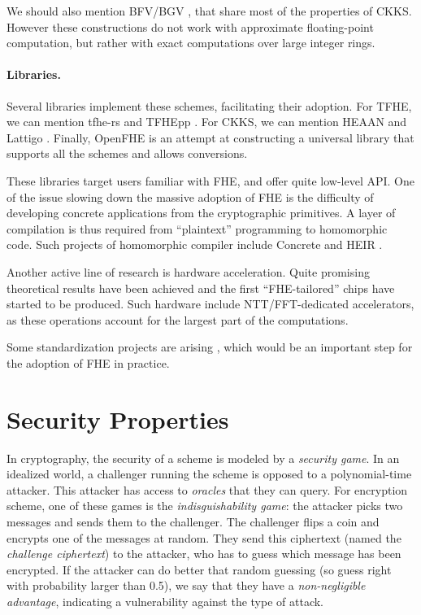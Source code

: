 We should also mention BFV/BGV \cite{C:Brakerski12, bgv, EPRINT:FanVer12}, that share most of the properties of CKKS. However these constructions do not work with approximate floating-point computation, but rather with exact computations over large integer rings.


\paragraph{Libraries.}
Several libraries implement these schemes, facilitating their adoption. For \gls{TFHE}, we can mention tfhe-rs \cite{tfhe-rs}  and TFHEpp \cite{TFHEpp}. For CKKS, we can mention HEAAN \cite{heaan} and Lattigo \cite{lattigo}. Finally, OpenFHE \cite{OpenFHE} is an attempt at constructing a universal library that supports all the schemes and allows conversions.


These libraries target users familiar with \gls{FHE}, and offer quite low-level API. One of the issue slowing down the massive adoption of \gls{FHE} is the difficulty of developing concrete applications from the cryptographic primitives. A layer of compilation is thus required from ``plaintext'' programming to homomorphic code. Such projects of homomorphic compiler include Concrete \cite{Concrete} and HEIR \cite{HEIR}.

\medskip
Another active line of research is hardware acceleration. Quite promising theoretical results have been achieved \cite{TCHES:GVPHMS23, EPRINT:BBTV23a, EPRINT:CPBFSJ23, EPRINT:KHMR24} and the first ``\gls{FHE}-tailored'' chips have started to be produced. Such hardware include \acrshort{NTT}/\acrshort{FFT}-dedicated accelerators, as these operations account for the largest part of the computations. 


Some standardization projects are arising \cite{HomomorphicEncryptionSecurityStandard, call_nist}, which would be an important step for the adoption of \gls{FHE} in practice.
 	


\section{Security Properties}


In cryptography, the security of a scheme is modeled by a \textit{security game}. In an idealized world, a challenger running the scheme is opposed to a polynomial-time attacker. This attacker has access to \textit{oracles} that they can query. For encryption scheme, one of these games is the \textit{indisguishability game}: the attacker picks two messages and sends them to the challenger. The challenger flips a coin and encrypts one of the messages at random. They send this ciphertext (named the \textit{challenge ciphertext}) to the attacker, who has to guess which message has been encrypted. If the attacker can do better that random guessing (so guess right with probability larger than 0.5), we say that they have a \textit{non-negligible advantage}, indicating a vulnerability against the type of attack.

